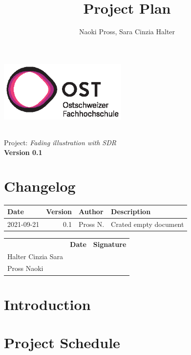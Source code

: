 \documentclass[a4paper, twosided, 11pt]{scrartcl}
\title{Project Plan}
\author{Naoki Pross, Sara Cinzia Halter}
\begin{document}
\begin{titlepage}
	\includegraphics[height=3cm]{fig/ost-logo}
	\begin{flushright}
		\vspace{5cm}
		{\Huge \bfseries \thetitle} \\
		\vspace{5mm}
		{\LARGE Project: \textit{Fading illustration with SDR}} \\
		\vspace{5mm}
		{\LARGE \bfseries Version 0.1}
	\end{flushright}
\end{titlepage}

\section*{Changelog}
\begin{tabularx}{\textwidth}{lrlX}
	\toprule
	\bfseries Date & \bfseries Version & \bfseries Author & \bfseries Description \\
	\midrule
	2021-09-21 & 0.1 & Pross N.  & Crated empty document \\
	\bottomrule
\end{tabularx}

\vfill
{
	\renewcommand{\arraystretch}{2}
	\begin{tabularx}{\textwidth}{lp{}X}
		                   & \bfseries Date & \bfseries Signature\\
		Halter Cinzia Sara & \hrulefill & \hrulefill \\
		Pross Naoki        & \hrulefill & \hrulefill \\
	\end{tabularx}
}

\clearpage
\tableofcontents
\listoffigures
\listoftables
\clearpage

\section{Introduction}

\section{Project Schedule}
\end{document}
